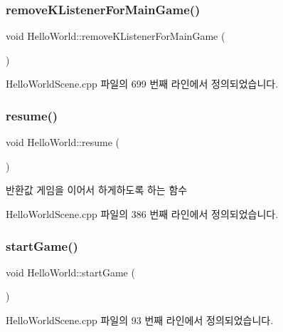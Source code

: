 \subsubsection{\texorpdfstring{remove\+K\+Listener\+For\+Main\+Game()}{removeKListenerForMainGame()}}
{\footnotesize\ttfamily void Hello\+World\+::remove\+K\+Listener\+For\+Main\+Game (\begin{DoxyParamCaption}{ }\end{DoxyParamCaption})\hspace{0.3cm}{\ttfamily [protected]}}



Hello\+World\+Scene.\+cpp 파일의 699 번째 라인에서 정의되었습니다.

\mbox{\label{class_hello_world_ad72b45627fe36ea8cd04b9de431edc7f}} 
\subsubsection{\texorpdfstring{resume()}{resume()}}
{\footnotesize\ttfamily void Hello\+World\+::resume (\begin{DoxyParamCaption}{ }\end{DoxyParamCaption})\hspace{0.3cm}{\ttfamily [protected]}}

\begin{DoxyReturn}{반환값}
게임을 이어서 하게하도록 하는 함수 
\end{DoxyReturn}


Hello\+World\+Scene.\+cpp 파일의 386 번째 라인에서 정의되었습니다.

\mbox{\label{class_hello_world_aa4c36099096e160e3726819a2308dd04}} 
\subsubsection{\texorpdfstring{start\+Game()}{startGame()}}
{\footnotesize\ttfamily void Hello\+World\+::start\+Game (\begin{DoxyParamCaption}{ }\end{DoxyParamCaption})}



Hello\+World\+Scene.\+cpp 파일의 93 번째 라인에서 정의되었습니다.

